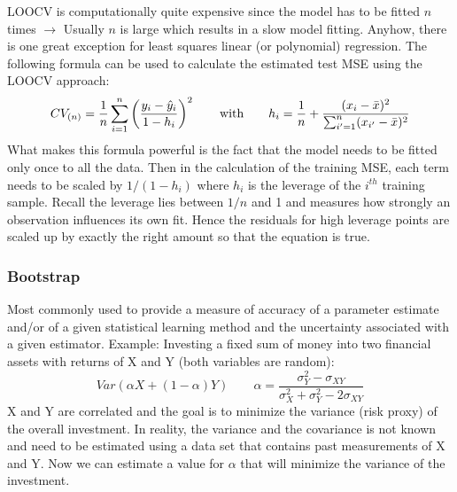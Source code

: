 {LOOCV is computationally quite expensive since the model has to be fitted $n$ times $\rightarrow$ Usually $n$ is large which results in a slow model fitting.
Anyhow, there is one great exception for least squares linear (or polynomial) regression.
The following formula can be used to calculate the estimated test MSE using the LOOCV approach:
\[ CV_{(n)}=\frac{1}{n} \sum_{i=1}^{n} \left( \frac{y_i-\hat{y}_i}{1-h_i} \right)^2 \qquad \text{with} \qquad
h_i= \frac{1}{n}+ \frac{(x_i-\bar{x})^2}{\sum_{i'=1}^{n}(x_{i'}-\bar{x})^2} \]
What makes this formula powerful is the fact that the model needs to be fitted only once to all the data.
Then in the calculation of the training MSE, each term needs to be scaled by $1/(1-h_i)$ where $h_i$ is the leverage of the $i^{th}$ training sample.
Recall the leverage lies between $1/n$ and 1 and measures how strongly an observation influences its own fit.
Hence the residuals for high leverage points are scaled up by exactly the right amount so that the equation is true.

\subsubsection{Bootstrap}
Most commonly used to provide a measure of accuracy of a parameter estimate and/or of a given statistical learning method and the uncertainty associated with a given estimator.
Example:  Investing a fixed sum of money into two financial assets with returns of X and Y (both variables are random):
\[ Var(\alpha X+(1-\alpha)Y) \qquad \alpha =\frac{\sigma_Y^2-\sigma_{XY}}{\sigma_X^2+\sigma_Y^2-2\sigma_{XY}}\]
X and Y are correlated and the goal is to minimize the variance (risk proxy) of the overall investment.
In reality, the variance and the covariance is not known and need to be estimated using a data set that contains past measurements of  X and Y.
Now we can estimate a value for $\alpha$ that will minimize  the variance of the investment.

}
